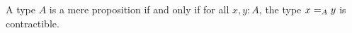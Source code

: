 \documentclass[hott-all.tex]{subfiles}
\begin{document}

\begin{lem}\label{thm:prop-minusonetype}
  A type $A$ is a mere proposition if and only if for all $x,y:A$, the type $\id[A]xy$ is contractible.
\end{lem}
%
%
\end{document}
